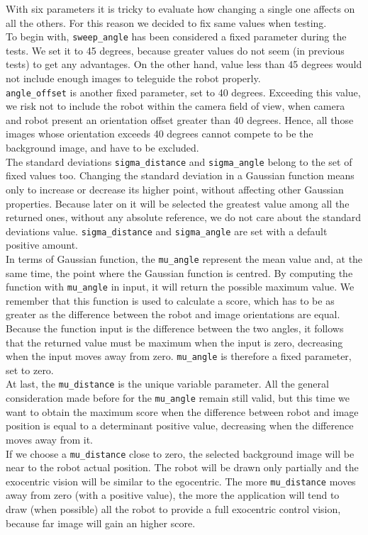 With six parameters it is tricky to evaluate how changing
a single one affects on all the others. For this
reason we decided to fix same values when testing.
\\
To begin with, \texttt{sweep\_angle} has been considered a
fixed parameter during the tests. We set it to 45 degrees,
because greater values do not seem (in previous tests) to get
any advantages. On the other hand, value less than 45
degrees would not include enough images to teleguide the robot
properly.
\\
\texttt{angle\_offset} is another fixed parameter, set to 40
degrees. Exceeding this value, we risk not to include
the robot within the camera field of view, when camera and robot
present an orientation offset greater than 40 degrees.
Hence, all those images whose orientation exceeds 40 degrees
cannot compete to be the background image, 
and have to be excluded.
\\
The standard deviations \texttt{sigma\_distance} and
\texttt{sigma\_angle} belong to the set of
fixed values too. Changing the standard deviation in a Gaussian
function means only to increase or decrease its higher
point, without affecting other Gaussian properties. Because later
on it will be selected the greatest value among
all the returned ones, without any absolute reference, we do not
care about the standard deviations value.
\texttt{sigma\_distance} and \texttt{sigma\_angle} are set
with a default positive amount.
\\
In terms of Gaussian function, the \texttt{mu\_angle} represent
the mean value and, at the same time, the point where
the Gaussian function is centred. By computing the function with
\texttt{mu\_angle} in input, it will return the possible
maximum value. We remember that this function is used to calculate
a score, which has to be as greater as the difference
between the robot and image orientations are equal. Because the
function input is the difference between the two angles, it
follows that the returned value must be maximum when the input is
zero, decreasing when the input moves away from zero.
\texttt{mu\_angle} is therefore a fixed parameter, set to zero.
\\
At last, the \texttt{mu\_distance} is the unique variable parameter.
All the general consideration made before for the 
\texttt{mu\_angle} remain still valid, but this time we want to
obtain the maximum score when the difference between
robot and image position is equal to a determinant positive value,
decreasing when the difference moves away from it.
\\
If we choose a \texttt{mu\_distance} close to zero, the selected
background image will be near to the robot actual position.
The robot will be drawn only partially and the exocentric vision
will be similar to the egocentric. The more
\texttt{mu\_distance} moves away from zero (with a positive value),
the more the application will tend to draw
(when possible) all the robot to provide a full exocentric control
vision, because far image will gain an higher score.
